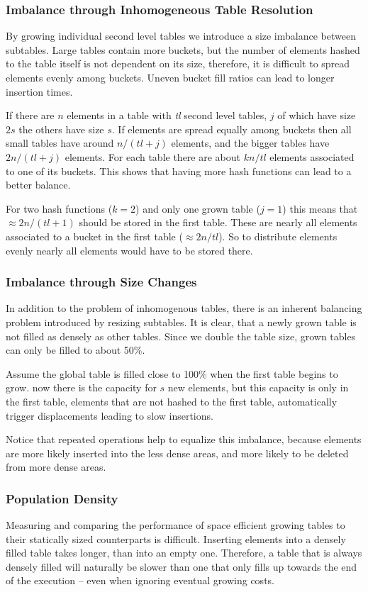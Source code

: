 \documentclass[a4paper,UKenglish]{lipics-v2016}
\begin{document}
\subsubsection*{Imbalance through Inhomogeneous Table Resolution}
\label{sec:inhom_res}
By growing individual second level tables we introduce a size imbalance
between subtables.  Large tables contain more buckets, but the number
of elements hashed to the table itself is not dependent on its size,
therefore, it is difficult to spread elements evenly among buckets.
Uneven bucket fill ratios can lead to longer insertion times.

If there are $n$ elements in a table with \emph{tl} second level tables,
$j$ of which have size $2s$ the others have size $s$. If elements are
spread equally among buckets then all small tables have around
$n/(tl+j)$ elements, and the bigger tables have $2n/(tl+j)$ elements.
For each table there are about $kn/tl$ elements associated to one of
its buckets.  This shows that having more hash functions can lead to a
better balance.

For two hash functions ($k=2$) and only one grown table ($j=1$) this
means that $\approx 2n/(tl+1)$ should be stored in the first table.
These are nearly all elements associated to a bucket in the first
table ($\approx 2n/tl$). So to distribute elements evenly nearly all
elements would have to be stored there.

\subsubsection*{Imbalance through Size Changes}
In addition to the problem of inhomogenous tables, there is an
inherent balancing problem introduced by resizing subtables. It is
clear, that a newly grown table is not filled as densely as other
tables.  Since we double the table size, grown tables can only be
filled to about 50\%.

Assume the global table is filled close to 100\% when the first table begins
to grow.  now there is the capacity for $s$ new elements, but this
capacity is only in the first table, elements that are not hashed to
the first table, automatically trigger displacements leading to slow
insertions.

Notice that repeated operations help to equalize this imbalance,
because elements are more likely inserted into the less dense areas,
and more likely to be deleted from more dense areas.

\subsubsection*{Population Density}
Measuring and comparing the performance of space efficient growing
tables to their statically sized counterparts is difficult.  Inserting
elements into a densely filled table takes longer, than into an empty
one.  Therefore, a table that is always densely filled will naturally
be slower than one that only fills up towards the end of the
execution -- even when ignoring eventual growing costs.
\end{document}
